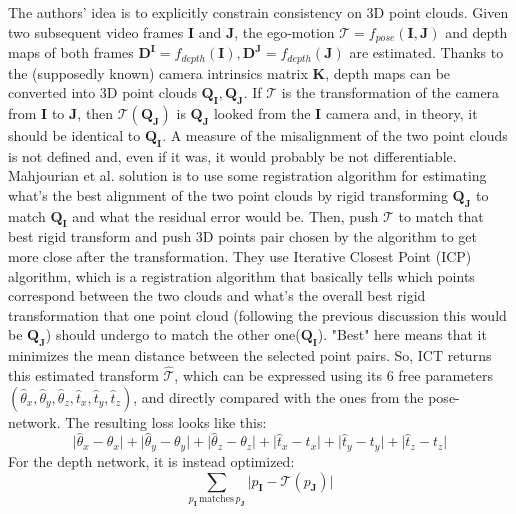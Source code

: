 The authors' idea is to explicitly constrain consistency on 3D point clouds.
Given two subsequent video frames $\mathbf{I}$ and $\mathbf{J}$, the ego-motion $\mathcal{T} = f_{pose}(\mathbf{I}, \mathbf{J})$ and depth maps of both frames $\mathbf{D}^{\mathbf{I}} = f_{depth}(\mathbf{I}), \mathbf{D}^{\mathbf{J}} = f_{depth}(\mathbf{J})$ are estimated.
Thanks to the (supposedly known) camera intrinsics matrix $\mathbf{K}$, depth maps can be converted into 3D point clouds $\mathbf{Q}_{\mathbf{I}}, \mathbf{Q}_{\mathbf{J}}$.
If $\mathcal{T}$ is the transformation of the camera from $\mathbf{I}$ to $\mathbf{J}$, then $\mathcal{T} ( \mathbf{Q}_{\mathbf{J}} )$ is $\mathbf{Q}_{\mathbf{J}}$ looked from the $\mathbf{I}$ camera and, in theory, it should be identical to $\mathbf{Q}_{\mathbf{I}}$.
A measure of the misalignment of the two point clouds is not defined and, even if it was, it would probably be not differentiable.
Mahjourian et al. solution is to use some registration algorithm for estimating what's the best alignment of the two point clouds by rigid transforming $\mathbf{Q}_{\mathbf{J}}$ to match $\mathbf{Q}_{\mathbf{I}}$ and what the residual error would be.
Then, push $\mathcal{T}$ to match that best rigid transform and push 3D points pair chosen by the algorithm to get more close after the transformation.
They use Iterative Closest Point (ICP) algorithm, which is a registration algorithm that basically tells which points correspond between the two clouds and what's the overall best rigid transformation that one point cloud (following the previous discussion this would be $\mathbf{Q}_{\mathbf{J}}$) should undergo to match the other one($\mathbf{Q}_{\mathbf{I}}$).
"Best" here means that it minimizes the mean distance between the selected point pairs.
So, ICT returns this estimated transform $\hat{\mathcal{T}}$, which can be expressed using its 6 free parameters $(\hat{\theta}_{x}, \hat{\theta}_{y}, \hat{\theta}_{z}, \hat{t}_{x}, \hat{t}_{y}, \hat{t}_{z})$, and directly compared with the ones from the pose-network.
The resulting loss looks like this:
\[
	\big| \hat{\theta}_{x} - \theta_{x} \big| +
	\big| \hat{\theta}_{y} - \theta_{y} \big| +
	\big| \hat{\theta}_{z} - \theta_{z} \big| +
	\big| \hat{t}_{x} - t_{x} \big| +
	\big| \hat{t}_{y} - t_{y} \big| +
	\big| \hat{t}_{z} - t_{z} \big|
\]
For the depth network, it is instead optimized:
\[
	\sum_{p_{\mathbf{I}} \, \text{matches} \, p_{\mathbf{J}}} \big| p_{\mathbf{I}} - \mathcal{T} (p_{\mathbf{J}}) \big|
\]

